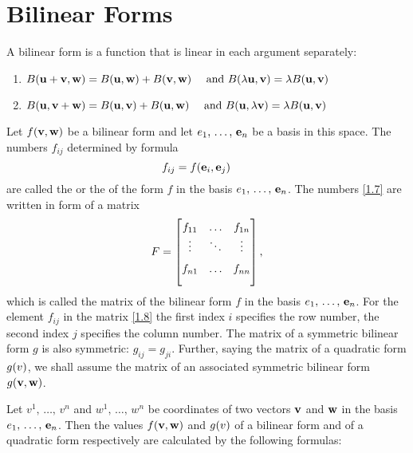 % 
% 

\section{Bilinear Forms}

A bilinear form is a function that is  linear in each argument
separately:

\begin{enumerate}
\item $B(\mathbf{ u} + \mathbf{ v}, \mathbf{ w}) = B(\mathbf{ u},
\mathbf{ w}) + B(\mathbf{ v}, \mathbf{ w}) \quad \text{ and }
B(\lambda \mathbf{ u}, \mathbf{ v}) = \lambda B(\mathbf{ u},
\mathbf{ v})$

\item  $B(\mathbf{ u}, \mathbf{ v} + \mathbf{ w}) = B(\mathbf{ u},
\mathbf{ v}) + B(\mathbf{ u}, \mathbf{ w})  \quad \text{ and }
B(\mathbf{ u}, \lambda\mathbf{ v}) = \lambda B(\mathbf{ u},
\mathbf{ v})$
\end{enumerate}


Let $f(\mathbf{ v},\mathbf{ w})$ be a bilinear form  and let $\bold \vector{e}_1,\,\dots,\,\bold e_n$ be a basis
in this space. The numbers $f_{ij}$ determined by formula
\begin{equation}
\hskip -2em
f_{ij}=f( \vector{e}_i, \vector{e}_j)
\label{1.7}\end{equation}
are called the  or the  of the form $f$
in the basis $\bold \vector{e}_1,\,\dots,\,\bold e_n$. The numbers \ref{1.7} 
are written in form of a matrix 
\begin{equation}
F=\begin{bmatrix}
 f_{11} & \hdots & f_{1n}\\
\vspace{1.5ex}
\vdots & \ddots & \vdots\\
\vspace{1.5ex}
f_{n1} & \hdots & f_{nn}
\end{bmatrix},
\label{1.8}
\end{equation}
which is called the matrix of the bilinear form $f$ in the basis $\bold \vector{e}_1,
\,\dots,\,\bold e_n$. For the element $f_{ij}$ in the matrix \ref{1.8} the first index $i$ specifies the row number, the second index $j$ specifies
the column number. The matrix of a symmetric bilinear form $g$ is also
symmetric: $g_{ij}=g_{ji}$. Further, saying the matrix of a quadratic
form $g(\bold \vector{v})$, we shall assume the matrix of an associated symmetric bilinear form $g(\mathbf{ v},\mathbf{ w})$.\par
     Let $v^1,\,\dots,\,v^n$ and $w^1,\,\dots,\,w^n$ be coordinates of
two vectors $\mathbf{ v}$ and $\mathbf{ w}$ in the basis $\bold \vector{e}_1,\,\dots,\,
\bold e_n$. Then the values $f(\mathbf{ v},\mathbf{ w})$ and $g(\bold \vector{v})$ of a
bilinear form and of a quadratic form respectively are calculated by the
following formulas:

